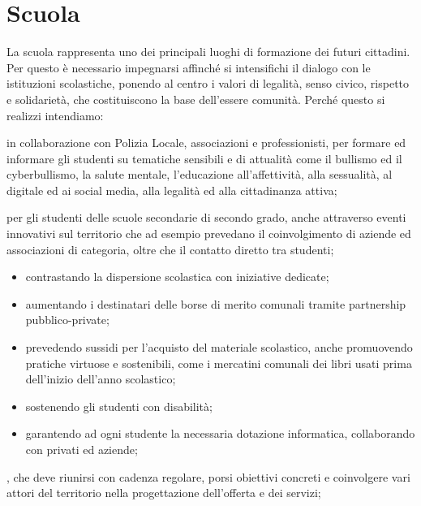 \section{Scuola}
La scuola rappresenta uno dei principali luoghi di formazione dei futuri cittadini. Per questo è necessario  impegnarsi affinché si intensifichi il dialogo con le istituzioni scolastiche, ponendo al centro i valori di legalità, senso civico, rispetto e solidarietà, che costituiscono la base dell'essere comunità. Perché questo si realizzi intendiamo:

 in collaborazione con Polizia Locale, associazioni e professionisti, per formare ed informare gli studenti  su tematiche sensibili e di attualità come il bullismo ed il cyberbullismo, la salute mentale, l'educazione all'affettività, alla sessualità, al digitale ed ai social media, alla legalità ed alla cittadinanza attiva;

 per gli studenti delle scuole secondarie di secondo grado, anche attraverso eventi innovativi sul territorio che ad esempio prevedano il coinvolgimento di aziende ed associazioni di categoria, oltre che il contatto diretto tra studenti;

\begin{bluebox}
\begin{itemize}
  \item contrastando la dispersione scolastica con iniziative dedicate; 
  \item aumentando i destinatari delle borse di merito comunali tramite partnership pubblico-private;
  \item prevedendo sussidi per l'acquisto del materiale scolastico, anche promuovendo  pratiche virtuose e sostenibili, come i mercatini comunali dei libri usati prima dell'inizio dell'anno scolastico;
  \item sostenendo gli studenti con disabilità; 
  \item garantendo ad ogni studente la necessaria dotazione informatica, collaborando con privati ed aziende; 
\end{itemize}
\end{bluebox}

, che deve riunirsi con cadenza regolare, porsi obiettivi concreti e coinvolgere vari attori del territorio nella progettazione dell'offerta e dei servizi;

